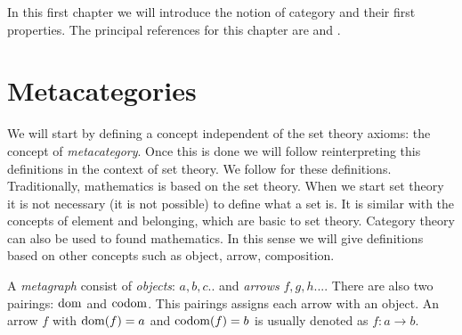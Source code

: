 In this first chapter we will introduce the notion of category and their first properties. The principal references for this chapter are \cite{mac2013categories} and \cite{riehl2017category}. 

\section{Metacategories}
We will start by defining a concept independent of the set theory axioms: the concept of \emph{metacategory}. Once this is done we will follow reinterpreting this definitions in the context of set theory. We follow  \cite{mac2013categories} for these definitions.\\


Traditionally, mathematics is based on the set theory. When we start set theory it is not necessary (it is not possible) to define what a set is. It is similar with the concepts of element and belonging, which are basic to set theory. Category theory can also be used to found mathematics. In this sense we will give definitions based on other concepts such as object, arrow, composition. \\

\begin{definition}
  A \emph{metagraph} consist of \emph{objects}: $a,b,c..$ and \emph{arrows} $f,g,h...$. There are also two pairings: $\operatorname{dom}$ and $\operatorname{codom}$. This pairings assigns each arrow with an object. An arrow $f$ with $\operatorname{dom}(f)=a$ and $\operatorname{codom}(f)=b$ is usually denoted as $f:a\to b$.\\
\end{definition}

